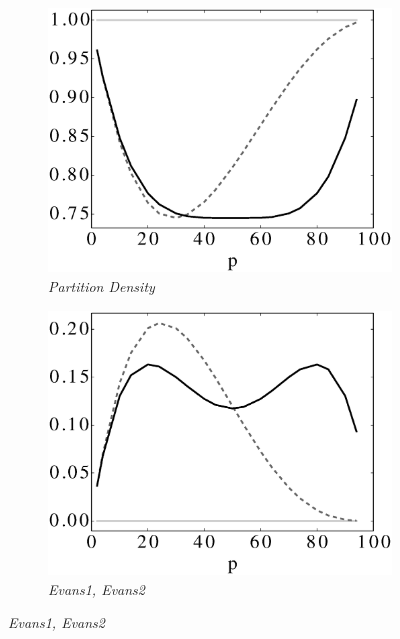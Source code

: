 \begin{figure}
\centering
	\begin{subfigure}{0.4\linewidth}
		\includegraphics[width=\linewidth]{img/ExpectedNodes/1Clique/Clique_Partitiondensity.eps}
		\caption{\label{fig:1CAhn}\emph{Partition Density}}		
	\end{subfigure}\hspace*{1cm}
	\begin{subfigure}{0.4\linewidth}
		\includegraphics[width=\linewidth]{img/ExpectedNodes/1Clique/Clique_Evans1.eps}
		\caption{\label{fig:1CE2}\emph{Evans1, Evans2}}		
	\end{subfigure}


\end{figure}
